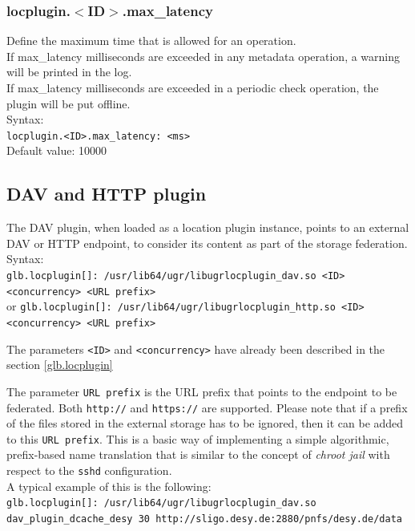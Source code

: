 \documentclass[12pt]{article} %
\begin{document}
\subsubsection{locplugin.$<$ID$>$.max\_latency}
Define the maximum time that is allowed for an operation.\\
If max\_latency milliseconds are exceeded in any metadata operation, a warning will be printed in the log.\\
If max\_latency milliseconds are exceeded in a periodic check operation, the plugin will be put offline.\\

Syntax:\\
\lstinline"locplugin.<ID>.max_latency: <ms>"\\
Default value: 10000\\

\subsection{DAV and HTTP plugin}

The DAV plugin, when loaded as a location plugin instance, points to an external DAV or HTTP endpoint, to consider its content as part of the storage federation.\\

Syntax:\\
\lstinline"glb.locplugin[]: /usr/lib64/ugr/libugrlocplugin_dav.so <ID> <concurrency> <URL prefix>"\\
or
\lstinline"glb.locplugin[]: /usr/lib64/ugr/libugrlocplugin_http.so <ID> <concurrency> <URL prefix>"


The parameters \lstinline"<ID>" and \lstinline"<concurrency>" have already been described in the section \ref{glb.locplugin}

The parameter \lstinline"URL prefix" is the URL prefix that points to the endpoint to be federated. Both \lstinline"http://" and \lstinline"https://" are supported. Please note that if a prefix of the files stored in the external storage has to be ignored, then it can be added to this \lstinline"URL prefix". This is a basic way of implementing a simple algorithmic, prefix-based name translation that is similar to the concept of \textit{chroot jail} with respect to the \lstinline"sshd" configuration.\\

A typical example of this is the following:\\
\lstinline"glb.locplugin[]: /usr/lib64/ugr/libugrlocplugin_dav.so dav_plugin_dcache_desy 30 http://sligo.desy.de:2880/pnfs/desy.de/data"\\ \\
\end{document}
